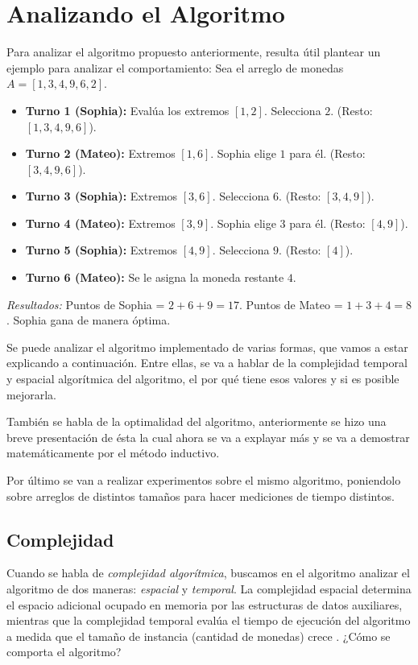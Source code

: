 \section{Analizando el Algoritmo}

Para analizar el algoritmo propuesto anteriormente, resulta útil plantear un ejemplo para analizar el comportamiento:
Sea el arreglo de monedas $A = [1, 3, 4, 9, 6, 2]$.
\begin{itemize}
    \item \textbf{Turno 1 (Sophia):} Evalúa los extremos $[1, 2]$. Selecciona $2$. (Resto: $[1, 3, 4, 9, 6]$).
    \item \textbf{Turno 2 (Mateo):} Extremos $[1, 6]$. Sophia elige $1$ para él. (Resto: $[3, 4, 9, 6]$).
    \item \textbf{Turno 3 (Sophia):} Extremos $[3, 6]$. Selecciona $6$. (Resto: $[3, 4, 9]$).
    \item \textbf{Turno 4 (Mateo):} Extremos $[3, 9]$. Sophia elige $3$ para él. (Resto: $[4, 9]$).
    \item \textbf{Turno 5 (Sophia):} Extremos $[4, 9]$. Selecciona $9$. (Resto: $[4]$).
    \item \textbf{Turno 6 (Mateo):} Se le asigna la moneda restante $4$.
\end{itemize}
\textit{Resultados:} Puntos de Sophia = $2 + 6 + 9 = 17$. Puntos de Mateo = $1 + 3 + 4 = 8$. Sophia gana de manera óptima.


Se puede analizar el algoritmo implementado de varias formas, que vamos a estar explicando a continuación. Entre ellas, se va a hablar de la complejidad temporal y espacial algorítmica del algoritmo, el por qué tiene esos valores y si es posible mejorarla.

También se habla de la optimalidad del algoritmo, anteriormente se hizo una breve presentación de ésta la cual ahora se va a explayar más y se va a demostrar matemáticamente por el método inductivo.

Por último se van a realizar experimentos sobre el mismo algoritmo, poniendolo sobre arreglos de distintos tamaños para hacer mediciones de tiempo distintos.


\subsection{Complejidad}

Cuando se habla de \textit{complejidad algorítmica}, buscamos en el algoritmo analizar el algoritmo de dos maneras: \textit{espacial} y \textit{temporal}. La complejidad espacial determina el espacio adicional ocupado en memoria por las estructuras de datos auxiliares, mientras que la complejidad temporal evalúa el tiempo de ejecución del algoritmo a medida que el tamaño de instancia (cantidad de monedas) crece . ¿Cómo se comporta el algoritmo?

